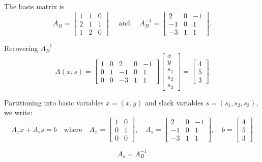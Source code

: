 The basis matrix is 
$$
A_B = \begin{bmatrix}
1 & 1 & 0\\
2 & 1 & 1\\
1 & 2 & 0
\end{bmatrix}
\quad \text{ and } \quad
A_B^{-1} = \begin{bmatrix}
2 & 0 & -1\\
-1 & 0 & 1\\
-3 & 1 & 1
\end{bmatrix}.
$$


\begin{remark}{Recovering $A_B^{-1}$}{}
\[
A(x, s) =
\begin{bmatrix}
1 & 0 & 2 & 0 & -1 \\
0 & 1 & -1 & 0 & 1 \\
0 & 0 & -3 & 1 & 1
\end{bmatrix}
\begin{bmatrix}
x \\ y \\ s_1 \\ s_2 \\ s_3
\end{bmatrix}
=
\begin{bmatrix}
4 \\ 5 \\ 3
\end{bmatrix}
\]

Partitioning into basic variables \( x = (x, y) \) and slack variables \( s = (s_1, s_2, s_3) \), we write:
\[
A_x x + A_s s = b
\quad \text{where} \quad
A_x =
\begin{bmatrix}
1 & 0 \\
0 & 1 \\
0 & 0
\end{bmatrix}, \quad
A_s =
\begin{bmatrix}
2 & 0 & -1 \\
-1 & 0 & 1 \\
-3 & 1 & 1
\end{bmatrix}, \quad
b =
\begin{bmatrix}
4 \\ 5 \\ 3
\end{bmatrix}
\]

\[
A_s = A_B^{-1}
\]


\end{remark}




